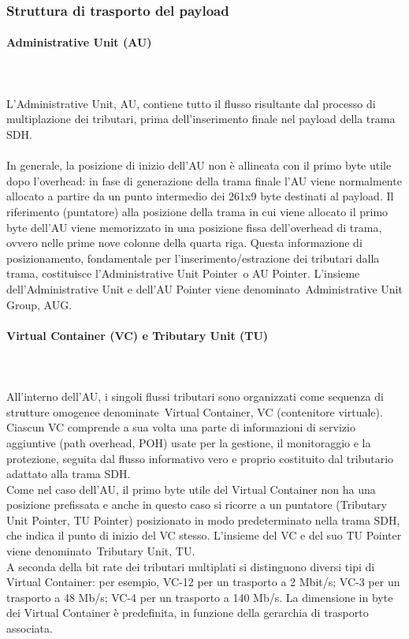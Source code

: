 \documentclass{article}
\begin{document}
\subsubsection{Struttura di trasporto del payload}
\paragraph{Administrative Unit (AU)}
\noindent
\\\\
L'Administrative Unit, AU, contiene tutto il flusso risultante dal processo di multiplazione dei tributari,
 prima dell'inserimento finale nel payload della trama SDH.\\\\
In generale, la posizione di inizio dell'AU non è allineata con il primo byte utile dopo l'overhead: 
in fase di generazione della trama finale l'AU viene normalmente allocato a partire da un punto intermedio 
dei 261x9 byte destinati al payload. Il riferimento (puntatore) alla posizione della trama in cui viene 
allocato il primo byte dell'AU viene memorizzato in una posizione fissa dell'overhead di trama, ovvero 
nelle prime nove colonne della quarta riga. Questa informazione di posizionamento, fondamentale per 
l'inserimento/estrazione dei tributari dalla trama, costituisce l'Administrative Unit Pointer o AU Pointer. 
L'insieme dell'Administrative Unit e dell'AU Pointer viene denominato Administrative Unit Group, AUG.
\paragraph{Virtual Container (VC) e Tributary Unit (TU)}
\noindent
\\\\
All'interno dell'AU, i singoli flussi tributari sono organizzati come sequenza di strutture omogenee 
denominate Virtual Container, VC (contenitore virtuale). Ciascun VC comprende a sua volta una parte 
di informazioni di servizio aggiuntive (path overhead, POH) usate per la gestione, il monitoraggio e la 
protezione, seguita dal flusso informativo vero e proprio costituito dal tributario adattato alla trama SDH.\\
Come nel caso dell'AU, il primo byte utile del Virtual Container non ha una posizione prefissata e anche 
in questo caso si ricorre a un puntatore (Tributary Unit Pointer, TU Pointer) posizionato in modo 
predeterminato nella trama SDH, che indica il punto di inizio del VC stesso. L'insieme del VC e del suo 
TU Pointer viene denominato Tributary Unit, TU.\\
A seconda della bit rate dei tributari multiplati si distinguono diversi tipi di Virtual Container: 
per esempio, VC-12 per un trasporto a 2 Mbit/s; VC-3 per un trasporto a 48 Mb/s; VC-4 per un trasporto 
a 140 Mb/s. La dimensione in byte dei Virtual Container è predefinita, in funzione della gerarchia di 
trasporto associata.
\end{document}
